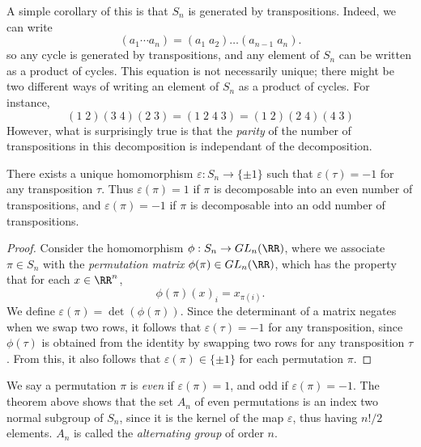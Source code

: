 A simple corollary of this is that $S_n$ is generated by transpositions. Indeed, we can write
%
\[ (a_1 \cdots a_n) = (a_1\; a_2) \dots (a_{n-1}\; a_n). \]
%
so any cycle is generated by transpositions, and any element of $S_n$ can be written as a product of cycles. This equation is not necessarily unique; there might be two different ways of writing an element of $S_n$ as a product of cycles. For instance,
%
\[ (1\; 2)(3\; 4)(2\; 3) = (1\; 2\; 4\; 3) = (1\; 2)(2\; 4)(4\; 3) \]
%
However, what is surprisingly true is that the \emph{parity} of the number of transpositions in this decomposition is independant of the decomposition.

\begin{theorem}
    There exists a unique homomorphism $\varepsilon: S_n \to \{ \pm 1 \}$ such that $\varepsilon(\tau) = -1$ for any transposition $\tau$. Thus $\varepsilon(\pi) = 1$ if $\pi$ is decomposable into an even number of transpositions, and $\varepsilon(\pi) = -1$ if $\pi$ is decomposable into an odd number of transpositions.
\end{theorem}
\begin{proof}
    Consider the homomorphism $\phi: S_n \to GL_n(\RR)$, where we associate $\pi \in S_n$ with the \emph{permutation matrix} $\phi(\pi) \in GL_n(\RR)$, which has the property that for each $x \in \RR^n$,
    \[ \phi(\pi)(x)_i = x_{\pi(i)}.  \]
    We define $\varepsilon(\pi) = \det(\phi(\pi))$. Since the determinant of a matrix negates when we swap two rows, it follows that $\varepsilon(\tau) = -1$ for any transposition, since $\phi(\tau)$ is obtained from the identity by swapping two rows for any transposition $\tau$. From this, it also follows that $\varepsilon(\pi) \in \{ \pm 1 \}$ for each permutation $\pi$.
\end{proof}

We say a permutation $\pi$ is \emph{even} if $\varepsilon(\pi) = 1$, and odd if $\varepsilon(\pi) = -1$. The theorem above shows that the set $A_n$ of even permutations is an index two normal subgroup of $S_n$, since it is the kernel of the map $\varepsilon$, thus having $n!/2$ elements. $A_n$ is called the \emph{alternating group} of order $n$.

